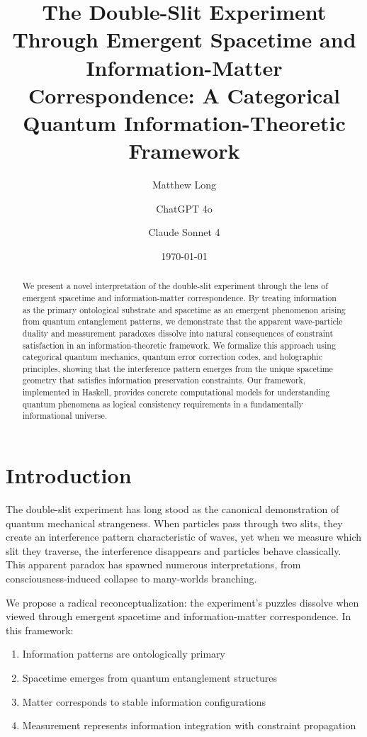 \documentclass[12pt,a4paper]{article}
\title{The Double-Slit Experiment Through Emergent Spacetime and Information-Matter Correspondence: A Categorical Quantum Information-Theoretic Framework}
\author[1]{Matthew Long}
\author[2]{ChatGPT 4o}
\author[3]{Claude Sonnet 4}
\affil[1]{Yoneda AI}
\affil[2]{OpenAI}
\affil[3]{Anthropic}
\date{\today}
\begin{document}
\maketitle

\begin{abstract}
We present a novel interpretation of the double-slit experiment through the lens of emergent spacetime and information-matter correspondence. By treating information as the primary ontological substrate and spacetime as an emergent phenomenon arising from quantum entanglement patterns, we demonstrate that the apparent wave-particle duality and measurement paradoxes dissolve into natural consequences of constraint satisfaction in an information-theoretic framework. We formalize this approach using categorical quantum mechanics, quantum error correction codes, and holographic principles, showing that the interference pattern emerges from the unique spacetime geometry that satisfies information preservation constraints. Our framework, implemented in Haskell, provides concrete computational models for understanding quantum phenomena as logical consistency requirements in a fundamentally informational universe.
\end{abstract}

\tableofcontents
\newpage

\section{Introduction}

The double-slit experiment has long stood as the canonical demonstration of quantum mechanical strangeness. When particles pass through two slits, they create an interference pattern characteristic of waves, yet when we measure which slit they traverse, the interference disappears and particles behave classically. This apparent paradox has spawned numerous interpretations, from consciousness-induced collapse to many-worlds branching.

We propose a radical reconceptualization: the experiment's puzzles dissolve when viewed through emergent spacetime and information-matter correspondence. In this framework:
\begin{enumerate}
\item Information patterns are ontologically primary
\item Spacetime emerges from quantum entanglement structures
\item Matter corresponds to stable information configurations
\item Measurement represents information integration with constraint propagation
\end{enumerate}
\end{document}
